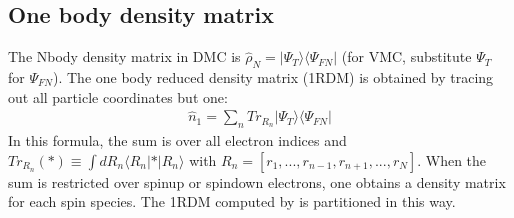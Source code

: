 \documentclass[letterpaper,10pt,english]{sphinxmanual}
\begin{document}
\subsection{One body density matrix}
\label{\detokenize{hamiltonianobservable:one-body-density-matrix}}
The N\sphinxhyphen{}body density matrix in DMC is
\(\hat{\rho}_N=\left|{\Psi_{T}}\rangle{}\langle{\Psi_{FN}}\right|\) (for VMC,
substitute \(\Psi_T\) for \(\Psi_{FN}\)). The one body reduced
density matrix (1RDM) is obtained by tracing out all particle
coordinates but one:
\begin{equation}\label{equation:hamiltonianobservable:eq40}
\begin{split}\hat{n}_1 = \sum_nTr_{R_n}\left|{\Psi_{T}}\rangle{}\langle{\Psi_{FN}}\right|\end{split}
\end{equation}
In this formula, the sum is over all electron indices and
\(Tr_{R_n}(*)\equiv\int dR_n\langle{R_n}\left|{*}\right|{R_n}\rangle\) with
\(R_n=[r_1,...,r_{n-1},r_{n+1},...,r_N]\). When the sum is
restricted over spin\sphinxhyphen{}up or spin\sphinxhyphen{}down electrons, one obtains a density
matrix for each spin species. The 1RDM computed by is partitioned in
this way.
\end{document}
